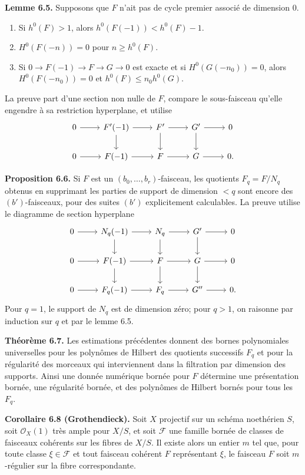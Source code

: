 \documentclass[11pt]{article}
\begin{document}
\textbf{Lemme 6.5.} Supposons que $F$ n'ait pas de cycle premier associ\'e de dimension $0$.
\begin{enumerate}[label=\roman*)]
\item Si $h^0(F)>1$, alors $h^0(F(-1))<h^0(F)-1$.
\item $H^0(F(-n))=0$ pour $n\ge h^0(F)$.
\item Si $0\to F(-1)\to F\to G\to0$ est exacte et si $H^0(G(-n_0))=0$, alors $H^0(F(-n_0))=0$ et $h^0(F)\le n_0h^0(G)$.
\end{enumerate}
La preuve part d'une section non nulle de $F$, compare le sous-faisceau qu'elle engendre \`a sa restriction hyperplane, et utilise
\[
\begin{tikzcd}
0 \arrow[r] & F'(-1) \arrow[r] \arrow[d] & F' \arrow[r] \arrow[d] & G' \arrow[r] \arrow[d] & 0 \\
0 \arrow[r] & F(-1) \arrow[r] & F \arrow[r] & G \arrow[r] & 0 .
\end{tikzcd}
\]

\textbf{Proposition 6.6.} Si $F$ est un $(b_0,\ldots,b_r)$-faisceau, les quotients $F_q=F/N_q$ obtenus en supprimant les parties de support de dimension $<q$ sont encore des $(b')$-faisceaux, pour des suites $(b')$ explicitement calculables. La preuve utilise le diagramme de section hyperplane
\[
\begin{tikzcd}
0 \arrow[r] & N_q(-1) \arrow[r] \arrow[d] & N_q \arrow[r] \arrow[d] & G' \arrow[r] \arrow[d] & 0 \\
0 \arrow[r] & F(-1) \arrow[r] \arrow[d] & F \arrow[r] \arrow[d] & G \arrow[r] \arrow[d] & 0 \\
0 \arrow[r] & F_q(-1) \arrow[r] & F_q \arrow[r] & G'' \arrow[r] & 0 .
\end{tikzcd}
\]
Pour $q=1$, le support de $N_q$ est de dimension z\'ero; pour $q>1$, on raisonne par induction sur $q$ et par le lemme 6.5.

\textbf{Th\'eor\`eme 6.7.} Les estimations pr\'ec\'edentes donnent des bornes polynomiales universelles pour les polyn\^omes de Hilbert des quotients successifs $F_q$ et pour la r\'egularit\'e des morceaux qui interviennent dans la filtration par dimension des supports. Ainsi une donn\'ee num\'erique born\'ee pour $F$ d\'etermine une pr\'esentation born\'ee, une r\'egularit\'e born\'ee, et des polyn\^omes de Hilbert born\'es pour tous les $F_q$.

\textbf{Corollaire 6.8 (Grothendieck).} Soit $X$ projectif sur un sch\'ema noeth\'erien $S$, soit $\mathcal O_X(1)$ tr\`es ample pour $X/S$, et soit $\mathcal F$ une famille born\'ee de classes de faisceaux coh\'erents sur les fibres de $X/S$. Il existe alors un entier $m$ tel que, pour toute classe $\xi\in\mathcal F$ et tout faisceau coh\'erent $F$ repr\'esentant $\xi$, le faisceau $F$ soit $m$-r\'egulier sur la fibre correspondante.
\end{document}
